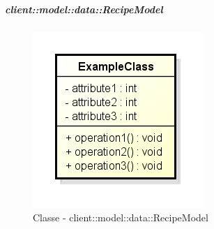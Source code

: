 		\subparagraph{client::model::data::RecipeModel} %
		\label{subp:client_model_data_recipe}
			\begin{figure}[htbp]
				\centering
				\centerline{\includegraphics[scale=0.7]{./images/client/classes/example_class.png}}
				\caption{Classe - client::model::data::RecipeModel}
			\end{figure}
